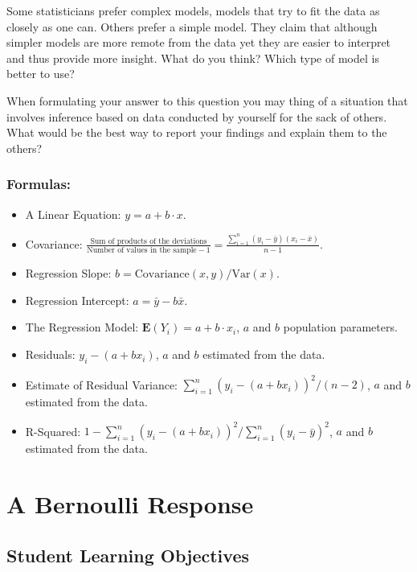 \documentclass[
]{krantz}
\newcommand{\Expec}{\mathbf{E}}
\theoremstyle{definition}
\theoremstyle{definition}
\theoremstyle{definition}
\theoremstyle{remark}
\begin{document}
Some statisticians prefer complex models, models that try to fit the
data as closely as one can. Others prefer a simple model. They claim
that although simpler models are more remote from the data yet they are
easier to interpret and thus provide more insight. What do you think?
Which type of model is better to use?

When formulating your answer to this question you may thing of a
situation that involves inference based on data conducted by yourself
for the sack of others. What would be the best way to report your
findings and explain them to the others?

\hypertarget{formulas}{%
\subsection*{Formulas:}\label{formulas}}


\begin{itemize}
\item
  A Linear Equation: \(y = a + b \cdot x\).
\item
  Covariance:
  \(\frac{\mbox{Sum of products of the deviations}}{\mbox{Number of values in the sample}-1} = \frac{\sum_{i=1}^n (y_i-\bar y)(x_i - \bar x)}{n-1}\).
\item
  Regression Slope: \(b = \mbox{Covariance}(x,y)/\mbox{Var}(x)\).
\item
  Regression Intercept: \(a = \bar y - b\bar x\).
\item
  The Regression Model: \(\Expec(Y_i) = a + b \cdot x_i\), \(a\) and \(b\)
  population parameters.
\item
  Residuals: \(y_i - (a + bx_i)\), \(a\) and \(b\) estimated from the data.
\item
  Estimate of Residual Variance:
  \(\sum_{i=1}^n(y_i - (a + bx_i))^2/(n-2)\), \(a\) and \(b\) estimated from
  the data.
\item
  R-Squared:
  \(1 - \sum_{i=1}^n(y_i - (a + bx_i))^2/\sum_{i=1}^n(y_i - \bar y)^2\),
  \(a\) and \(b\) estimated from the data.
\end{itemize}

\hypertarget{ChapLogistic}{%
\chapter{A Bernoulli Response}\label{ChapLogistic}}

\hypertarget{student-learning-objectives-9}{%
\section{Student Learning Objectives}\label{student-learning-objectives-9}}
\end{document}
